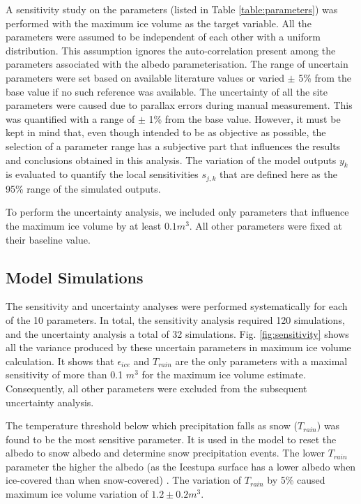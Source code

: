 \documentclass[utf8]{frontiersSCNS} %
\begin{document}
A sensitivity study on the parameters (listed in Table \ref{table:parameters}) was performed with the maximum ice volume
as the target variable. All the parameters were assumed to be independent of each other with a uniform distribution.
This assumption ignores the auto-correlation present among the parameters associated with the albedo parameterisation.
The range of uncertain parameters were set based on available literature values or varied $\pm$ 5\% from the base value
if no such reference was available. The uncertainty of all the site parameters were caused due to parallax errors during
manual measurement. This was quantified with a range of $\pm$ 1\% from the base value. However, it must be kept in mind
that, even though intended to be as objective as possible, the selection of a parameter range has a subjective part that
influences the results and conclusions obtained in this analysis.  The variation of the model outputs $y_k$ is evaluated
to quantify the local sensitivities $s_{j,k}$ that are defined here as the 95\% range of the simulated outputs.

To perform the uncertainty analysis, we included only parameters that influence the maximum ice volume by at least $0.1
m^3$. All other parameters were fixed at their baseline value.

\subsection{Model Simulations} The sensitivity and uncertainty analyses were performed systematically for each of the 10
parameters. In total, the sensitivity analysis required 120 simulations, and the uncertainty analysis a total of 32
simulations. Fig. \ref{fig:sensitivity} shows all the variance produced by these uncertain parameters in maximum ice
volume calculation. It shows that $\epsilon_{ice}$ and $T_{rain}$ are the only parameters with a maximal sensitivity of
more than 0.1 $m^3$ for the maximum ice volume estimate. Consequently, all other parameters were excluded from the
subsequent uncertainty analysis.

The temperature threshold below which precipitation falls as snow ($T_{rain}$) was found to be the most sensitive
parameter. It is used in the model to reset the albedo to snow albedo and determine snow precipitation events. The lower
$T_{rain}$ parameter the higher the albedo (as the Icestupa surface has a lower albedo when ice-covered than when
snow-covered) . The variation of $T_{rain}$ by 5\% caused maximum ice volume variation of $1.2 \pm 0.2 m^3$. 
\end{document}

